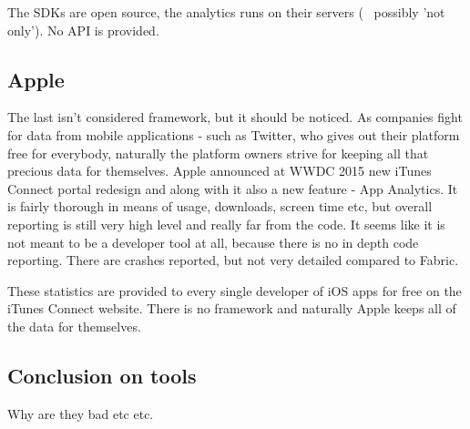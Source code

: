 The SDKs are open source, the analytics runs on their servers (~ possibly 'not only'). No API is provided.


\subsection{Apple}

The last isn't considered framework, but it should be noticed. As companies fight for data from mobile applications - such as Twitter, who gives out their platform free for everybody, naturally the platform owners strive for keeping all that precious data for themselves. Apple announced at WWDC 2015 new iTunes Connect portal redesign and along with it also a new feature - App Analytics. It is fairly thorough in means of usage, downloads, screen time etc, but overall reporting is still very high level and really far from the code. It seems like it is not meant to be a developer tool at all, because there is no in depth code reporting. There are crashes reported, but not very detailed compared to Fabric.

These statistics are provided to every single developer of iOS apps for free on the iTunes Connect website. There is no framework and naturally Apple keeps all of the data for themselves.


\subsection*{Conclusion on tools}

Why are they bad etc etc.